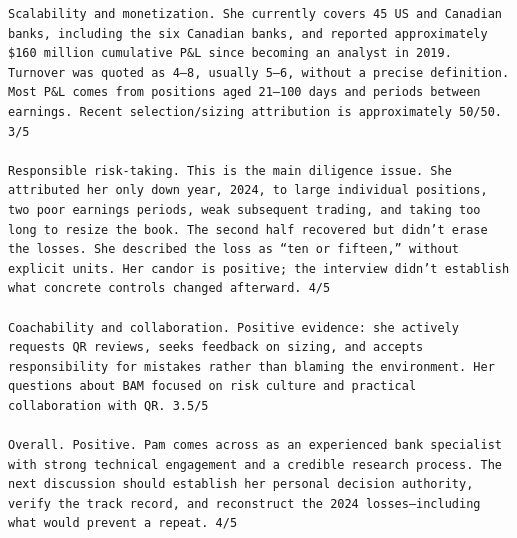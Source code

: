 \documentclass[11pt]{gappyarticle}
\begin{document}
\begin{verbatim}
Scalability and monetization. She currently covers 45 US and Canadian banks, including the six Canadian banks, and reported approximately $160 million cumulative P&L since becoming an analyst in 2019. Turnover was quoted as 4–8, usually 5–6, without a precise definition. Most P&L comes from positions aged 21–100 days and periods between earnings. Recent selection/sizing attribution is approximately 50/50. 3/5

Responsible risk-taking. This is the main diligence issue. She attributed her only down year, 2024, to large individual positions, two poor earnings periods, weak subsequent trading, and taking too long to resize the book. The second half recovered but didn’t erase the losses. She described the loss as “ten or fifteen,” without explicit units. Her candor is positive; the interview didn’t establish what concrete controls changed afterward. 4/5

Coachability and collaboration. Positive evidence: she actively requests QR reviews, seeks feedback on sizing, and accepts responsibility for mistakes rather than blaming the environment. Her questions about BAM focused on risk culture and practical collaboration with QR. 3.5/5

Overall. Positive. Pam comes across as an experienced bank specialist with strong technical engagement and a credible research process. The next discussion should establish her personal decision authority, verify the track record, and reconstruct the 2024 losses—including what would prevent a repeat. 4/5
  

\end{verbatim}

 
\end{document}
